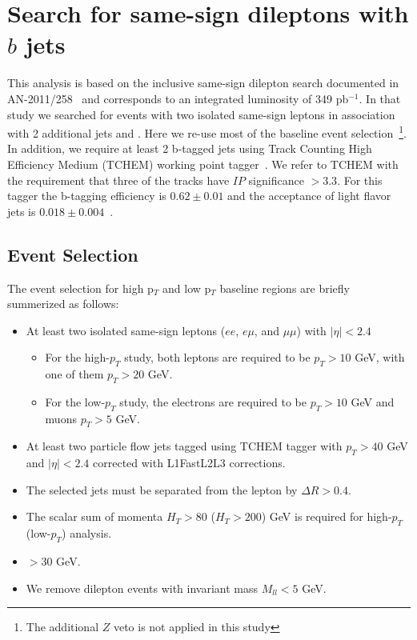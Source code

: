 \section{Search for same-sign dileptons with $b$ jets}
\label{searchbtag}

This analysis is based on the inclusive same-sign dilepton search documented in AN-2011/258~\cite{ssnote2011} and corresponds to an
integrated luminosity of 349 pb$^{-1}$. In that study we searched for events with two isolated same-sign leptons
in association with 2 additional jets and \met. Here we re-use most of the baseline event selection~\footnote{The additional 
$Z$ veto is not applied in this study}. In addition, we require at least 2 b-tagged jets using Track Counting High Efficiency 
Medium (TCHEM) working point tagger~\cite{BTVPAS2011}. We refer to TCHEM with the requirement that three of the tracks have $IP$ 
significance $ > 3.3$. For this tagger the b-tagging efficiency is $0.62 \pm 0.01$ and the acceptance of light flavor jets 
is $0.018 \pm 0.004$~\cite{BTVPAS2011}.

\subsection{Event Selection}
\label{eventsel}

The event selection for high p$_T$  and low p$_T$ baseline regions are briefly summerized as follows:

\begin{itemize}
\item At least two isolated same-sign leptons ($ee$, $e\mu$, and $\mu\mu$) with $|\eta| < 2.4$
\begin{itemize}
\item For the high-$p_T$ study, both leptons are required to be $p_T > 10$ GeV, with one of them $p_T > 20$ GeV.
\item For the low-$p_T$ study, the electrons are required to be $p_T > 10$ GeV and muons $p_T > 5$ GeV.
\end{itemize}
\item At least two particle flow jets tagged using TCHEM tagger with $p_T > 40$ GeV and $|\eta| < 2.4$ corrected with L1FastL2L3 corrections.
\item The selected jets must be separated from the lepton by $\Delta R > 0.4$.
\item The scalar sum of momenta $H_T > 80$ ($H_T > 200$) GeV is required for high-$p_T$ (low-$p_T$) analysis.
\item \met $> 30$ GeV.
\item We remove dilepton events with invariant mass $M_{ll} < 5$ GeV.
\end{itemize}


